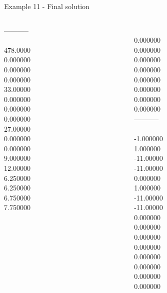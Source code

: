 \begin{frame}{Example 11 - Final solution}
\begin{columns}[t]
\begin{column}{0.3\textwidth}
-----------\\
\\
478.0000\\
0.000000\\
0.000000\\
0.000000\\
33.00000\\
0.000000\\
0.000000\\
0.000000\\
27.00000\\
0.000000\\
0.000000\\
9.000000\\
12.00000\\
6.250000\\
6.250000\\
6.750000\\
7.750000\\

\end{column}  

\begin{column}{0.3\textwidth}
\\
0.000000\\
0.000000\\
0.000000\\
0.000000\\
0.000000\\
0.000000\\
0.000000\\
0.000000\\


-----------\\
\\

-1.000000\\
1.000000\\
-11.00000\\
-11.00000\\
0.000000\\
1.000000\\
-11.00000\\
-11.00000\\
0.000000\\
0.000000\\
0.000000\\
0.000000\\
0.000000\\
0.000000\\
0.000000\\
0.000000\\
\end{column}
\end{columns}  
\end{frame}

